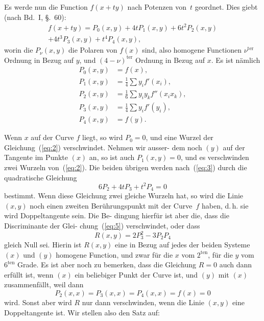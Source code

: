 \documentclass[12pt,a4paper]{article}
\theoremstyle{definition}
\begin{document}
Es werde nun die Function $f(x + ty)$ nach Potenzen von~$t$
geordnet. Dies giebt (nach Bd.~I, \S.~60):
\begin{multline}\label{eq:3}
f(x + ty) = P_0(x,y) + 4tP_1(x,y) + 6t^2 P_2(x,y)\\
+ 4t^3 P_3(x,y) + t^4 P_4(x,y),
\end{multline}
worin die $P_\nu(x,y)$ die Polaren von $f(x)$ sind, also homogene
Functionen $\nu^{\text{ter}}$ Ordnung in Bezug auf $y$, und $(4-\nu)^{\text{ter}}$ Ordnung
in Bezug auf $x$. Es ist nämlich
\begin{equation}\label{eq:4}
\begin{aligned}
P_0(x,y) &= f(x),\\
P_1(x,y) &= \tfrac{1}{4} \sum y_i f'(x_i),\\
P_2(x,y) &= \tfrac{1}{6} \sum y_i y_k f''(x_i x_k),\\
P_3(x,y) &= \tfrac{1}{4} \sum y_i f'(y_i),\\
P_4(x,y) &= f(y).
\end{aligned}
\end{equation}

Wenn $x$ auf der Curve $f$ liegt, so wird $P_0 = 0$, und eine
Wurzel der Gleichung~(\ref{eq:2}) verschwindet. Nehmen wir ausser-
dem noch $(y)$ auf der Tangente im Punkte $(x)$ an, so ist auch
$P_1(x,y) = 0$, und es verschwinden zwei Wurzeln von~(\ref{eq:2}). Die
beiden übrigen werden nach~(\ref{eq:3}) durch die quadratische Gleichung
\begin{equation}\label{eq:5}
6P_2 + 4tP_3 + t^2 P_4 = 0
\end{equation}
bestimmt. Wenn diese Gleichung zwei gleiche Wurzeln hat, so
wird die Linie $(x,y)$ noch einen zweiten Berührungspunkt mit
der Curve~$f$ haben, d.\,h. sie wird Doppeltangente sein. Die Be-
dingung hierfür ist aber die, dass die Discriminante der Glei-
chung~(\ref{eq:5}) verschwindet, oder dass
\begin{equation}\label{eq:6}
R(x,y) = 2P_3^2 - 3P_2 P_4
\end{equation}
gleich Null sei. Hierin ist $R(x,y)$ eine in Bezug auf jedes der
beiden Systeme $(x)$ und $(y)$ homogene Function, und zwar für
die $x$ vom $2^{\text{ten}}$, für die $y$ vom $6^{\text{ten}}$ Grade. Es ist aber noch zu
bemerken, dass die Gleichung $R = 0$ auch dann erfüllt ist,
wenn $(x)$ ein beliebiger Punkt der Curve ist, und $(y)$ mit $(x)$
zusammenfällt, weil dann
\[P_2(x,x) = P_3(x,x) = P_4(x,x) = f(x) = 0\]
wird. Sonst aber wird $R$ nur dann verschwinden, wenn die Linie
$(x,y)$ eine Doppeltangente ist. Wir stellen also den Satz auf:
\end{document}
